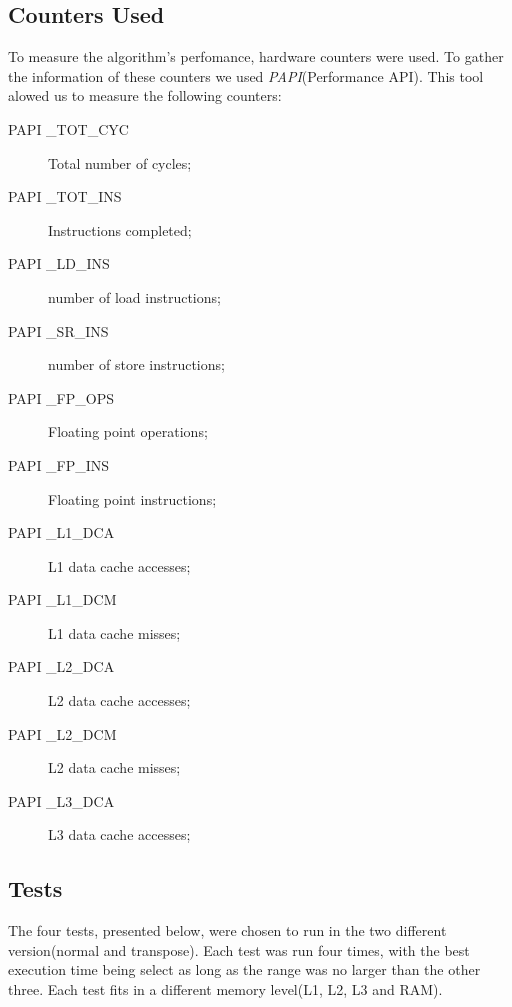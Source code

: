 \documentclass[a4paper,10pt,openright,openbib]{article}
\begin{document}
\subsection{Counters Used}
To measure the algorithm's perfomance, hardware counters were used. To gather the information of these counters we used \emph{PAPI}(Performance API). This tool alowed us to measure the following counters:
\begin{description}
\item[PAPI \_TOT\_CYC] Total number of cycles;
\item[PAPI \_TOT\_INS] Instructions completed;
\item[PAPI \_LD\_INS] number of load instructions;
\item[PAPI \_SR\_INS] number of store instructions;
\item[PAPI \_FP\_OPS] Floating point operations;
\item[PAPI \_FP\_INS] Floating point instructions;
\item[PAPI \_L1\_DCA] L1 data cache accesses;
\item[PAPI \_L1\_DCM] L1 data cache misses;
\item[PAPI \_L2\_DCA] L2 data cache accesses;
\item[PAPI \_L2\_DCM] L2 data cache misses;
\item[PAPI \_L3\_DCA] L3 data cache accesses;
\end{description}

\subsection{Tests}
The four tests, presented below, were chosen to run in the two different version(normal and transpose). Each test was run four times, with the best execution time being select as long as the range was no larger than the other three. Each test fits in a different memory level(L1, L2, L3 and RAM).   
\begin{table}[!htp]
\end{table}
\end{document}
